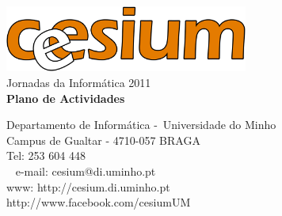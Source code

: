 \begin{titlepage}
	\begin{center}
		\vspace*{\fill}
		\includegraphics[width=0.6\textwidth]{files/cesiumLogoSolido}\\
		\Huge{Jornadas da Informática 2011}\\

		\vspace{20pt}
		\Huge\textbf{Plano de Actividades}\\
		\vspace*{\fill}
	\end{center}

	\begin{flushright}
		Departamento de Informática - Universidade do Minho\\
        Campus de Gualtar - 4710-057 BRAGA\\
        Tel: 253 604 448\\ 
        e-mail: cesium@di.uminho.pt\\
        www: http://cesium.di.uminho.pt\\
        http://www.facebook.com/cesiumUM
	\end{flushright}
\end{titlepage}
